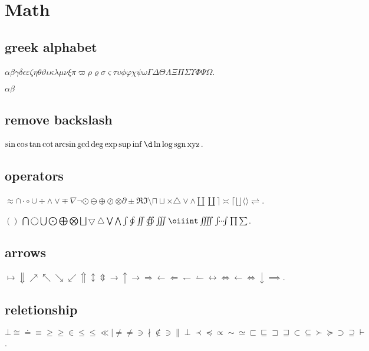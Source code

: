 \documentclass{ctexbook}
\DeclareMathOperator{\sgn}{sgn}
\begin{document}
\section{Math}
\subsection{greek alphabet}
\(\alpha\beta\gamma\delta\epsilon\varepsilon\zeta\eta\theta\vartheta\iota\kappa\lambda\mu\nu\xi\pi\varpi\rho\varrho\sigma\varsigma\tau\upsilon\phi\varphi\chi\psi\omega\Gamma\Delta\Theta\Lambda\Xi\Pi\Sigma\Upsilon\Phi\Psi\Omega\).

\(\alpha \beta\)
\subsection{remove backslash}
\(\sin \cos \tan \cot \arcsin \gcd \deg \exp \sup \inf \d \ln \log \sgn \operatorname{xyz}\).

\subsection{operators}
\(\approx \cap \cdot \circ \cup \div \land \lor \mp \nabla \neg \odot \ominus \oplus \oslash \otimes \partial \pm \Re \Im \setminus \sqcap \sqcup \times \triangle \vee \wedge \amalg \coprod \rceil \asymp \lceil \lfloor \rfloor \langle \rangle \rightleftharpoons \).

\(\left( \right)\)
\(\bigcap \bigcirc \bigcup \bigodot \bigoplus \bigotimes \bigsqcup \bigtriangledown \bigtriangleup \bigvee \bigwedge \int \oint \iint \oiint \iiint \oiiint \iiiint \idotsint \prod \sum \).

\subsection{arrows}
\(\mapsto \Downarrow \nearrow \nwarrow \searrow \swarrow \Uparrow \updownarrow \Updownarrow \to \uparrow \rightarrow \Rightarrow \leftarrow \Leftarrow \leftharpoondown \leftharpoonup \leftrightarrow \Leftrightarrow \gets \iff \downarrow \implies\).

\subsection{reletionship}
\(\bot \cong \doteq \equiv \ge \geq \in \le \leq \ll \mid \ne \neq \ni \nmid \notin \owns \parallel \perp \prec \preceq \propto \sim \simeq \sqsubset \sqsubseteq \sqsupset \sqsupseteq \subset \subseteq \succ \succeq \supset \supseteq \vdash \).
\end{document}
